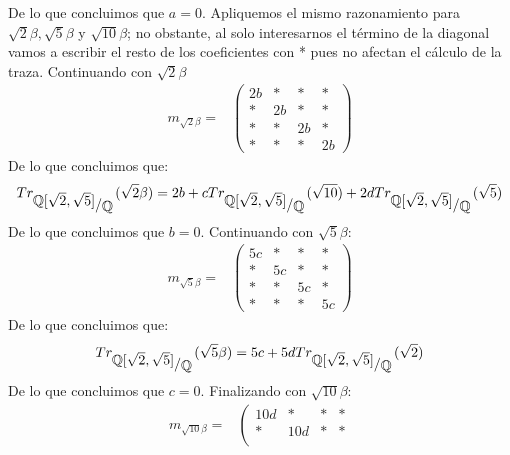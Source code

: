 \documentclass[11pt]{article}
\newcommand{\Q}{\mathbb{Q}}
\newcommand{\quotient}[2]{{\raisebox{.2em}{$#1$}\left/\raisebox{-.2em}{$#2$}\right.}}
\numberwithin{theorem}{subsection}
\begin{document}
\begin{enumerate}
\begin{itemize}
{\begin{equation*}
		\end{equation*}	
		De lo que concluimos que $a=0$. Apliquemos el mismo razonamiento para $\sqrt{2}\beta, \sqrt{5}\beta$ y $\sqrt{10}\beta$; no obstante, al solo interesarnos el t\'ermino de la diagonal vamos a escribir el resto de los coeficientes con * pues no afectan el c\'alculo de la traza. Continuando con $\sqrt{2}\beta$
		\begin{equation*}
		\begin{aligned}
		m_{\sqrt{2}\beta} = & \left( 
		\begin{array}{cccc}
		2b & * & * & * \\
		* & 2b & * & * \\
		* & * & 2b & * \\
		* & * & * & 2b
		\end{array}
		\right)
		\end{aligned}
		\end{equation*}
		De lo que concluimos que:
		\begin{equation*}
		Tr_{\quotient{\Q[\sqrt{2}, \sqrt{5}]}{\Q}}(\sqrt{2}\beta) = 2b + c Tr_{\quotient{\Q[\sqrt{2}, \sqrt{5}]}{\Q}}(\sqrt{10}) + 2d Tr_{\quotient{\Q[\sqrt{2}, \sqrt{5}]}{\Q}}(\sqrt{5}) 
		\end{equation*}
		De lo que concluimos que $b=0$. Continuando con $\sqrt{5}\beta$:
		\begin{equation*}
		\begin{aligned}
		m_{\sqrt{5}\beta} = & \left( 
		\begin{array}{cccc}
		5c & * & * & * \\
		* & 5c & * & * \\
		* & * & 5c & * \\
		* & * & * & 5c
		\end{array}
		\right)
		\end{aligned}
		\end{equation*}
		De lo que concluimos que:
		\begin{equation*}
		Tr_{\quotient{\Q[\sqrt{2}, \sqrt{5}]}{\Q}}(\sqrt{5}\beta) = 5c + 5d Tr_{\quotient{\Q[\sqrt{2}, \sqrt{5}]}{\Q}}(\sqrt{2})
		\end{equation*}
		De lo que concluimos que $c=0$. Finalizando con $\sqrt{10}\beta$:
		\begin{equation*}
		\begin{aligned}
		m_{\sqrt{10}\beta} = & \left( 
		\begin{array}{cccc}
		10d & * & * & * \\
		* & 10d & * & * \\

\end{array}
\end{aligned}
\end{equation*}}
\end{itemize}
\end{enumerate}
\end{document}
